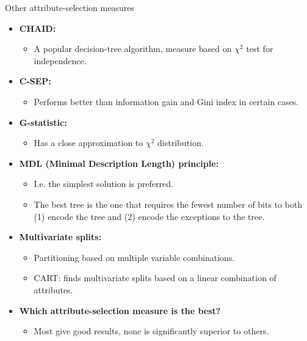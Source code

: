 \documentclass[aspectratio=169,t,table]{beamer}
\begin{document}
  {
    \begin{frame}{Other attribute-selection measures}
      \begin{itemize}
        \item \textbf{CHAID:}
        \begin{itemize}
          \item A popular decision-tree algorithm, measure based on $\chi^2$ test for independence.
        \end{itemize}
        \item \textbf{C-SEP:}
        \begin{itemize}
          \item Performs better than information gain and Gini index in certain cases.
        \end{itemize}
        \item \textbf{G-statistic:}
        \begin{itemize}
          \item Has a close approximation to $\chi^2$ distribution.
        \end{itemize}
        \item \textbf{MDL (Minimal Description Length) principle:}
        \begin{itemize}
          \item I.e. the simplest solution is preferred.
          \item The best tree is the one that requires the fewest number of bits to both (1) encode the tree and (2) encode the exceptions to the tree.
        \end{itemize}
        \item \textbf{Multivariate splits:}
        \begin{itemize}
          \item Partitioning based on multiple variable combinations.
          \item CART: finds multivariate splits based on a linear combination of attributes.
        \end{itemize}
        \item \textbf{Which attribute-selection measure is the best?}
        \begin{itemize}
          \item Most give good results, none is significantly superior to others.
        \end{itemize}
      \end{itemize}
    \end{frame}
  }
\end{document}
